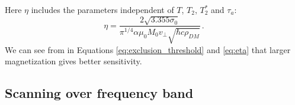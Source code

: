 Here $\eta$ includes the parameters independent of $T$, $T_2$, $T_2^*$ and $\tau_a$:
\begin{equation}
    \eta = \dfrac{2  \sqrt{3.355 \sigma_0} }{\pi^{1/4} \alpha \mu_0 M_0  v_{\bot} \sqrt{\hbar c \rho_{DM}} }
    \,.\label{eq:eta}
\end{equation}
We can see from in Equations \eqref{eq:exclusion_threshold} and \eqref{eq:eta} that larger magnetization gives better sensitivity. 


\subsection{Scanning over frequency band}

